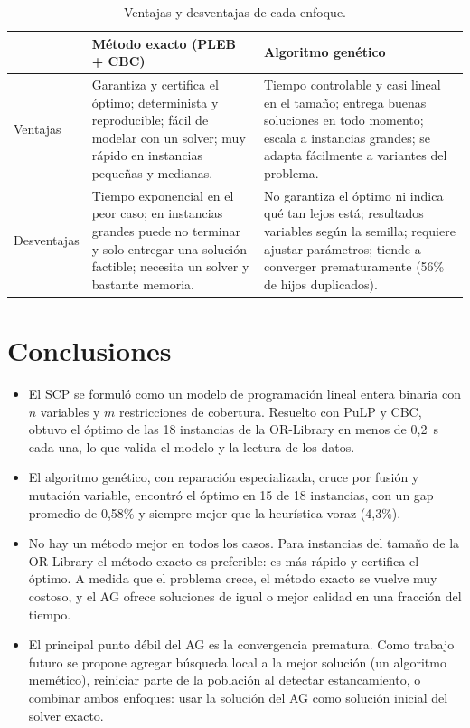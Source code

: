 \documentclass[11pt,a4paper]{article}
\begin{document}
\begin{table}[H]
\centering\small
\caption{Ventajas y desventajas de cada enfoque.}\label{tab:vd}
\begin{tabularx}{\textwidth}{l X X}
\toprule
& Método exacto (PLEB + CBC) & Algoritmo genético \\
\midrule
Ventajas &
Garantiza y certifica el óptimo; determinista y reproducible; fácil de modelar con un solver; muy rápido en instancias pequeñas y medianas. &
Tiempo controlable y casi lineal en el tamaño; entrega buenas soluciones en todo momento; escala a instancias grandes; se adapta fácilmente a variantes del problema. \\
\addlinespace
Desventajas &
Tiempo exponencial en el peor caso; en instancias grandes puede no terminar y solo entregar una solución factible; necesita un solver y bastante memoria. &
No garantiza el óptimo ni indica qué tan lejos está; resultados variables según la semilla; requiere ajustar parámetros; tiende a converger prematuramente (56\% de hijos duplicados). \\
\bottomrule
\end{tabularx}
\end{table}

\section{Conclusiones}
\begin{itemize}
  \item El SCP se formuló como un modelo de programación lineal entera binaria con $n$ variables y
  $m$ restricciones de cobertura. Resuelto con PuLP y CBC, obtuvo el óptimo de las 18 instancias de
  la OR-Library en menos de 0,2~s cada una, lo que valida el modelo y la lectura de los datos.
  \item El algoritmo genético, con reparación especializada, cruce por fusión y mutación variable,
  encontró el óptimo en 15 de 18 instancias, con un gap promedio de 0,58\% y siempre mejor que la
  heurística voraz (4,3\%).
  \item No hay un método mejor en todos los casos. Para instancias del tamaño de la OR-Library el
  método exacto es preferible: es más rápido y certifica el óptimo. A medida que el problema crece,
  el método exacto se vuelve muy costoso, y el AG ofrece soluciones de igual o mejor calidad en una
  fracción del tiempo.
  \item El principal punto débil del AG es la convergencia prematura. Como trabajo futuro se propone
  agregar búsqueda local a la mejor solución (un algoritmo memético), reiniciar parte de la población
  al detectar estancamiento, o combinar ambos enfoques: usar la solución del AG como solución inicial
  del solver exacto.
\end{itemize}



\end{document}

